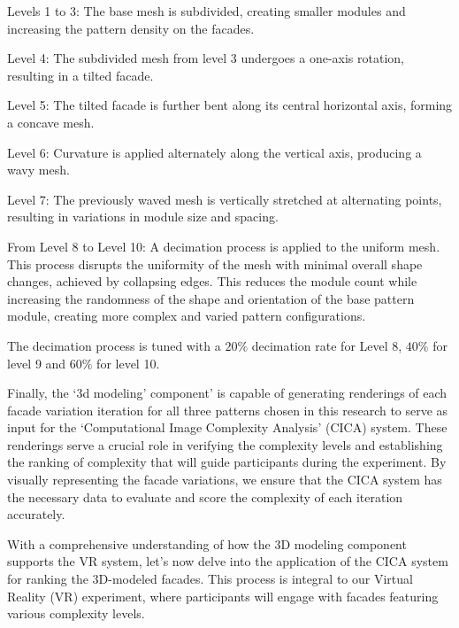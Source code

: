 Levels 1 to 3: The base mesh is subdivided, creating smaller modules and increasing the pattern density on the facades.

Level 4: The subdivided mesh from level 3 undergoes a one-axis rotation, resulting in a tilted facade.

Level 5: The tilted facade is further bent along its central horizontal axis, forming a concave mesh.

Level 6: Curvature is applied alternately along the vertical axis, producing a wavy mesh.

Level 7: The previously waved mesh is vertically stretched at alternating points, resulting in variations in module size and spacing.

From Level 8 to Level 10: A decimation process is applied to the uniform mesh.
This process disrupts the uniformity of the mesh with minimal overall shape changes\cite{Blender2023}, achieved by collapsing edges.
This reduces the module count while increasing the randomness of the shape and orientation of the base pattern module, creating more complex and varied pattern configurations.

The decimation process is tuned with a \(20\%\) decimation rate for Level 8, \(40\%\) for level 9 and \(60\%\) for level 10.

Finally, the `3d modeling' component' is capable of generating renderings of each facade variation iteration for all three patterns chosen in this research to serve as input for the `Computational Image Complexity Analysis' (CICA) system.
These renderings serve a crucial role in verifying the complexity levels and establishing the ranking of complexity that will guide participants during the experiment.
By visually representing the facade variations, we ensure that the CICA system has the necessary data to evaluate and score the complexity of each iteration accurately.

With a comprehensive understanding of how the 3D modeling component supports the VR system, let's now delve into the application of the CICA system for ranking the 3D-modeled facades.
This process is integral to our Virtual Reality (VR) experiment, where participants will engage with facades featuring various complexity levels.



%
%

